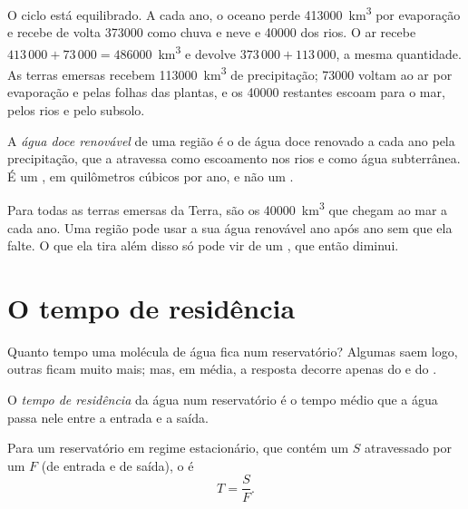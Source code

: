 O ciclo está equilibrado. A cada ano, o oceano perde \num{413000}~\unit{km^3}
por evaporação e recebe de volta \num{373000} como chuva e neve e
\num{40000} dos rios. O ar recebe $413\,000 + 73\,000 = \num{486000}$~\unit{km^3}
e devolve $373\,000 + 113\,000$, a mesma quantidade. As terras emersas
recebem \num{113000}~\unit{km^3} de precipitação; \num{73000} voltam ao ar
por evaporação e pelas folhas das plantas, e os \num{40000} restantes
escoam para o mar, pelos rios e pelo subsolo.

\begin{definition}\label{def:g10:freshwater-resources:renewable}
A \emph{água doce renovável}
de uma região é o  de água doce renovado a cada ano pela precipitação,
que a atravessa como escoamento nos rios e como água subterrânea. É um
, em quilômetros cúbicos por ano, e não um .
\end{definition}

Para todas as terras emersas da Terra, são os \num{40000}~\unit{km^3} que
chegam ao mar a cada ano. Uma região pode usar a sua água renovável ano após
ano sem que ela falte. O que ela tira além disso só pode vir de um ,
que então diminui.

\section{O tempo de residência}

Quanto tempo uma molécula de água fica num reservatório? Algumas saem logo,
outras ficam muito mais; mas, em média, a resposta decorre apenas do 
e do .

\begin{definition}\label{def:g10:freshwater-resources:residence-time}
O \emph{tempo de residência}
da água num reservatório é o tempo médio que a água passa nele entre a
entrada e a saída.
\end{definition}

\begin{proposition}\label{prop:g10:freshwater-resources:residence}
Para um reservatório em regime estacionário, que contém um  $S$
atravessado por um  $F$ (de entrada e de saída), o 
é
\[
T = \frac{S}{F}.
\]
\end{proposition}

